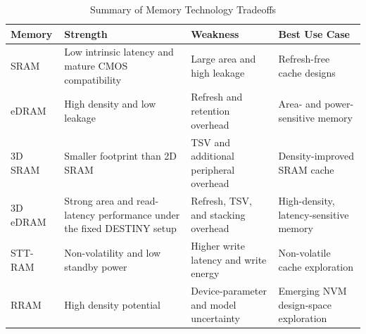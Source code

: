 \documentclass[conference]{IEEEtran}
\begin{document}
\begin{table}[t]
\caption{Summary of Memory Technology Tradeoffs}
\label{tab:tradeoff}
\centering
\renewcommand{\arraystretch}{1.15}
\setlength{\tabcolsep}{5pt}
\begin{tabularx}{\textwidth}{@{}
>{\RaggedRight\arraybackslash}p{}
>{\RaggedRight\arraybackslash}X
>{\RaggedRight\arraybackslash}X
>{\RaggedRight\arraybackslash}X
@{}}
\toprule
\textbf{Memory} & \textbf{Strength} & \textbf{Weakness} & \textbf{Best Use Case} \\
\midrule
SRAM & Low intrinsic latency and mature CMOS compatibility & Large area and high leakage & Refresh-free cache designs \\
eDRAM & High density and low leakage & Refresh and retention overhead & Area- and power-sensitive memory \\
3D SRAM & Smaller footprint than 2D SRAM & TSV and additional peripheral overhead & Density-improved SRAM cache \\
3D eDRAM & Strong area and read-latency performance under the fixed DESTINY setup & Refresh, TSV, and stacking overhead & High-density, latency-sensitive memory \\
STT-RAM & Non-volatility and low standby power & Higher write latency and write energy & Non-volatile cache exploration \\
RRAM & High density potential & Device-parameter and model uncertainty & Emerging NVM design-space exploration \\
\bottomrule
\end{tabularx}
\end{table}
\end{document}
